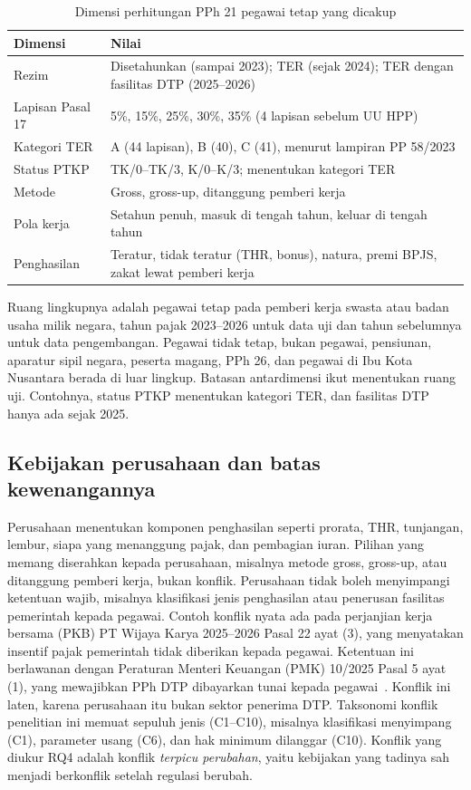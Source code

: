 \documentclass[conference]{IEEEtran}
\makeatletter
\DeclareRobustCommand{\en}[1]{{\usefont{\f@encoding}{\f@family}{\f@series}{it}#1\/}}
\makeatother
\begin{document}
\begin{table}[t]
\centering
\caption{Dimensi perhitungan PPh 21 pegawai tetap yang dicakup}
\label{tab:ruang-pajak}
\scriptsize
\begin{tabularx}{\columnwidth}{@{}P{2.0cm} L@{}}
\toprule
\textbf{Dimensi} & \textbf{Nilai} \\
\midrule
Rezim & Disetahunkan (sampai 2023); TER (sejak 2024); TER dengan fasilitas DTP (2025--2026) \\
Lapisan Pasal 17 & 5\%, 15\%, 25\%, 30\%, 35\% (4 lapisan sebelum UU HPP) \\
Kategori TER & A (44 lapisan), B (40), C (41), menurut lampiran PP 58/2023 \\
Status PTKP & TK/0--TK/3, K/0--K/3; menentukan kategori TER \\
Metode & \en{Gross}, \en{gross-up}, ditanggung pemberi kerja \\
Pola kerja & Setahun penuh, masuk di tengah tahun, keluar di tengah tahun \\
Penghasilan & Teratur, tidak teratur (THR, bonus), natura, premi BPJS, zakat lewat pemberi kerja \\
\bottomrule
\end{tabularx}
\end{table}

Ruang lingkupnya adalah pegawai tetap pada pemberi kerja swasta atau badan usaha milik negara, tahun pajak 2023--2026 untuk data uji dan tahun sebelumnya untuk data pengembangan. Pegawai tidak tetap, bukan pegawai, pensiunan, aparatur sipil negara, peserta magang, PPh 26, dan pegawai di Ibu Kota Nusantara berada di luar lingkup. Batasan antardimensi ikut menentukan ruang uji. Contohnya, status PTKP menentukan kategori TER, dan fasilitas DTP hanya ada sejak 2025.

\subsection{Kebijakan perusahaan dan batas kewenangannya}
Perusahaan menentukan komponen penghasilan seperti prorata, THR, tunjangan, lembur, siapa yang menanggung pajak, dan pembagian iuran. Pilihan yang memang diserahkan kepada perusahaan, misalnya metode \en{gross}, \en{gross-up}, atau ditanggung pemberi kerja, bukan konflik. Perusahaan tidak boleh menyimpangi ketentuan wajib, misalnya klasifikasi jenis penghasilan atau penerusan fasilitas pemerintah kepada pegawai. Contoh konflik nyata ada pada perjanjian kerja bersama (PKB) PT Wijaya Karya 2025--2026 Pasal 22 ayat (3), yang menyatakan insentif pajak pemerintah tidak diberikan kepada pegawai. Ketentuan ini berlawanan dengan Peraturan Menteri Keuangan (PMK) 10/2025 Pasal 5 ayat (1), yang mewajibkan PPh DTP dibayarkan tunai kepada pegawai~\cite{pmk10_2025}. Konflik ini laten, karena perusahaan itu bukan sektor penerima DTP. Taksonomi konflik penelitian ini memuat sepuluh jenis (C1--C10), misalnya klasifikasi menyimpang (C1), parameter usang (C6), dan hak minimum dilanggar (C10). Konflik yang diukur RQ4 adalah konflik \emph{terpicu perubahan}, yaitu kebijakan yang tadinya sah menjadi berkonflik setelah regulasi berubah.
\end{document}
